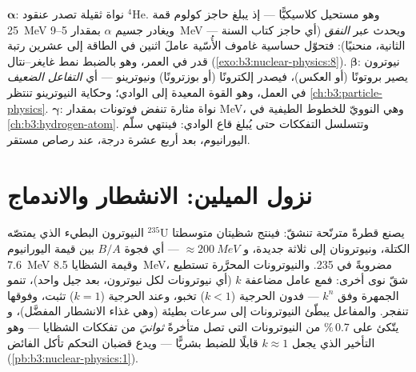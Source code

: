 \begin{remark}\label{rem:b3:nuclear-physics:modes}
$\boldsymbol\alpha$: نواة ثقيلة تصدر عنقود $^4$He. وهو مستحيل
كلاسيكيًّا --- إذ يبلغ حاجز كولوم قمة \qty{25}{MeV} ويغادر
جسيم $\alpha$ بمقدار \qty{5}{}--\qty{9}{MeV} --- ويحدث عبر
\emph{النفق} (أي حاجز كتاب السنة الثانية، منحنيًا): فتحوّل حساسية غاموف
الأُسّية عاملَ اثنين في الطاقة إلى عشرين
رتبة قدر في العمر، وهو بالضبط نمط غايغر--نتال
(\cref{exo:b3:nuclear-physics:8}).
$\boldsymbol\beta$: نيوترون يصير بروتونًا (أو العكس)، فيصدر
إلكترونًا (أو بوزترونًا) ونيوترينو --- أي \emph{التفاعل
الضعيف} في العمل، وهو القوة المعيدة إلى الوادي؛ وحكاية النيوترينو
تنتظر \cref{ch:b3:particle-physics}.
$\boldsymbol\gamma$: نواة مثارة تنفض فوتونات بمقدار \unit{MeV}، وهي
 النوويّ للخطوط الطيفية في \cref{ch:b3:hydrogen-atom}.
وتتسلسل التفككات حتى يُبلغ قاع الوادي: فينتهي سلّم اليورانيوم،
بعد أربع عشرة درجة، عند رصاص مستقر.
\end{remark}

\section{نزول الميلين: الانشطار والاندماج}

\begin{proposition}\label{prop:b3:nuclear-physics:fission}
النيوترون البطيء الذي يمتصّه $^{235}$U يصنع قطرةً مترنّحة
تنشقّ: فينتج شظيتان متوسطتا الكتلة، ونيوترونان إلى ثلاثة جديدة، و
$\approx\qty{200}{MeV}$ --- أي فجوة $B/A$ بين قيمة اليورانيوم
\qty{7.6}{MeV} وقيمة الشظايا \qty{8.5}{MeV}، مضروبةً في 235.
والنيوترونات المحرَّرة تستطيع شقّ نوى أخرى: فمع
عامل مضاعفة $k$ (أي نيوترونات لكل نيوترون، بعد جيل
واحد)، تنمو الجمهرة وفق $k^n$ --- فدون الحرجية ($k < 1$)
تخبو، وعند الحرجية ($k = 1$) تثبت، وفوقها تنفجر.
والمفاعل يبطّئ النيوترونات إلى سرعات بطيئة (وهي غذاء الانشطار المفضَّل)، و
يتّكئ على 0.7\,\% من النيوترونات التي تصل متأخرةً
\emph{ثوانيَ} من تفككات الشظايا --- وهو التأخير الذي يجعل
$k \approx 1$ قابلًا للضبط بشريًّا --- ويدع قضبان التحكم تأكل
الفائض (\cref{pb:b3:nuclear-physics:1}).
\end{proposition}
\admitted

